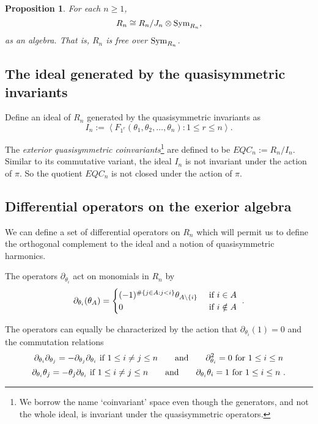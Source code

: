 \documentclass[submission]{FPSAC2023}
\newtheorem{prop}[theorem]{Proposition}
\theoremstyle{definition}
\numberwithin{equation}{section}
\begin{document}
\begin{prop} \label{prop:free}
For each $n \geq 1$,
$$R_n \cong R_n/J_n \otimes {\rm Sym}_{R_n},$$
as an algebra.  That is, $R_n$ is free over ${\rm Sym}_{R_n}$.
\end{prop}

\subsection{The ideal generated by the quasisymmetric invariants}

Define an ideal of $R_n$ generated by the quasisymmetric invariants as
\[
I_n := \left< F_{1^r}(\theta_1, \theta_2, \ldots, \theta_n) : 1 \leq r \leq n \right>.
\]


The \emph{exterior quasisymmetric coinvariants}\footnote{We borrow
the name `coinvariant' space even though the generators, and not the whole ideal, is invariant under the quasisymmetric operators.} are defined to be $EQC_n := R_n/I_n$. Similar to its commutative variant, the ideal $I_{n}$ is not invariant under the action of $\pi$. So the quotient $EQC_{n}$ is not closed under the action of $\pi$.


\subsection{Differential operators on the exerior algebra}\label{ssec:harm}
We can define a set of differential operators on $R_n$ which
will permit us to define the orthogonal complement to the
ideal and a notion of quasisymmetric harmonics.

The operators $\partial_{\theta_i}$ act on monomials in $R_n$
by
\[
\partial_{\theta_i}( \theta_A ) = \begin{cases}
(-1)^{\#\{ j \in A: j<i\}}\theta_{A \backslash \{i\}}&\hbox{ if }i \in A\\
0&\hbox{ if }i \notin A
\end{cases}~.
\]

The operators can equally be characterized by the action that $\partial_{\theta_i}(1) = 0$
and the commutation relations
\[
\partial_{\theta_i} \partial_{\theta_j}=-\partial_{\theta_j} \partial_{\theta_i}
\hbox{ if } 1 \leq i \neq j \leq n
\qquad\hbox{and}\qquad
\partial_{\theta_i}^2 = 0\hbox{ for }1 \leq i \leq n
\]
\[
\partial_{\theta_i} \theta_j=-\theta_j \partial_{\theta_i}
\hbox{ if } 1 \leq i \neq j \leq n
\qquad\hbox{and}\qquad
\partial_{\theta_i} \theta_i = 1\hbox{ for }1 \leq i \leq n~.
\]
\end{document}
